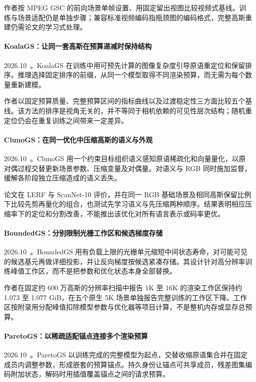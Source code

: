 作者按 MPEG GSC 的前向场景单帧设置、用固定留出视图比较视频式基线。训练与场景适配仍是单独步骤；兼容标准视频编码指瓶颈图的编码格式，完整高斯重建仍需论文的学习式处理。

\paragraph{KoalaGS：让同一套高斯在预算递减时保持结构}
2026.10~\cite{2610_28615}。KoalaGS 在训练中用可预先计算的图像复杂度引导原语重定位和保留排序。推理选择固定排序的前缀，从同一个模型取得不同渲染预算，而无需为每个数量重新建模。

作者以固定预算质量、完整预算区间的指标曲线以及过渡稳定性三方面比较五个基线。该方法的排序是视角无关的，并不等同于相机依赖的可见性层次结构；随机重定位仍会在重复训练之间带来一定差异。

\paragraph{ClunoGS：在同一优化中压缩高斯的语义与外观}
2026.10~\cite{2610_30013}。ClunoGS 用一个约束目标组织语义感知原语稀疏化和向量量化，以原对偶过程交替更新场景参数、压缩变量及对偶量。对语义与 RGB 同时施加监督，缓解各阶段独立压缩造成的语义丢失。

论文在 LERF 与 ScanNet-10 评价，并在同一 RGB 基础场景及相同高斯保留比例下比较先剪再量化的组合，也测试先学习语义与先压缩两种顺序。结果表明相应压缩率下的定位和分割改善，不能推出该优化对所有语言表示或码率更优。

\paragraph{BoundedGS：分别限制光栅工作区和候选梯度存储}
2026.10~\cite{2610_34233}。BoundedGS 用有负载上限的光栅单元缩短中间状态寿命，对可能可见的候选基元再做详细投影，并让反向梯度按候选紧凑存储。其设计针对高分辨率训练峰值工作区，而不是把参数和优化状态本身全部替换。

作者在固定约 600 万高斯的分辨率扫描中报告 1K 至 16K 的渲染工作区保持约 1.073 至 1.077 GiB，在五个原生 5K 场景单独报告完整训练的工作区下降。工作区按附录用分配峰值扣除模型参数与优化器等项目计算，不是整机内存或显存总预算。

\paragraph{ParetoGS：以稀疏适配锚点连接多个渲染预算}
2026.10~\cite{2610_34235}。ParetoGS 以训练完成的完整模型为起点，交替收缩原语集合并在固定成员内调整参数，形成嵌套的预算锚点。持久身份让锚点可共享成员，残差图集编码附加状态，解码时用插值覆盖锚点之间的请求预算。


